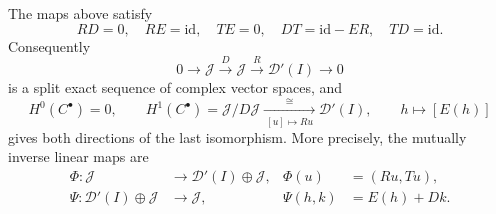 \begin{theorem}
\label{thm:SDB-exact}
The maps above satisfy
\begin{equation}\tag{SDB13}\label{eq:SDB-identities}
 RD=0,\quad RE=\mathrm{id},\quad TE=0,\quad
 DT=\mathrm{id}-ER,\quad TD=\mathrm{id}.
\end{equation}
Consequently
\begin{equation}\tag{SDB14}\label{eq:SDB-shortexact}
 0\longrightarrow\mathcal J\xrightarrow{D}\mathcal J
      \xrightarrow{R}\mathcal D'(I)\longrightarrow0
\end{equation}
is a split exact sequence of complex vector spaces, and
\begin{equation}\tag{SDB15}\label{eq:SDB-cohomology}
 H^0(C^\bullet)=0,\qquad
 H^1(C^\bullet)=\mathcal J/D\mathcal J
      \xrightarrow[{\ [u]\mapsto Ru\ }]{\ \cong\ }\mathcal D'(I),
 \qquad h\longmapsto[E(h)]
\end{equation}
gives both directions of the last isomorphism.
More precisely, the mutually inverse linear maps are
\begin{equation}\tag{SDB16}\label{eq:SDB-splitting}
 \begin{aligned}
  \Phi:\mathcal J&\longrightarrow\mathcal D'(I)\oplus\mathcal J,
       &\Phi(u)&=(Ru,Tu),\\
  \Psi:\mathcal D'(I)\oplus\mathcal J&\longrightarrow\mathcal J,
       &\Psi(h,k)&=E(h)+Dk.
 \end{aligned}
\end{equation}
\end{theorem}
